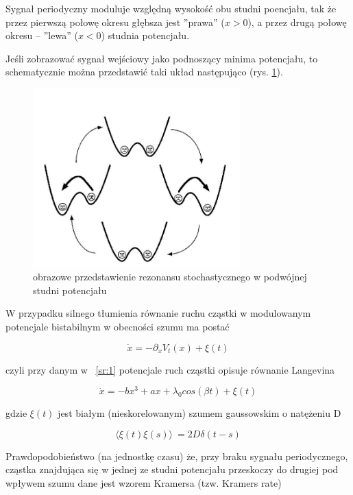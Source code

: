   Sygnał periodyczny moduluje względną wysokość obu studni poencjału, tak że przez pierwszą połowę okresu głębsza jest ''prawa'' ($x>0$), a przez drugą połowę okresu -- ''lewa'' ($x<0$) studnia potencjału.

  Jeśli zobrazować sygnał wejściowy jako podnoszący minima potencjału, to schematycznie można przedstawić taki układ następująco (rys. \ref{fig:graphics:double_well}).

  \begin{figure}
    \includegraphics[width=80mm]{images/sr.jpg}
    \caption{obrazowe przedstawienie rezonansu stochastycznego w podwójnej studni potencjału}
    \label{fig:graphics:double_well}
  \end{figure}

  W przypadku silnego tłumienia równanie ruchu cząstki w modulowanym potencjale bistabilnym w obecności szumu ma postać

  \begin{equation} \label{sr:2}
    \dot x = - \partial_x V_t(x) + \xi (t)
  \end{equation}

  czyli przy danym w ~\ref{sr:1} potencjale ruch cząstki opisuje równanie Langevina

  \begin{equation} \label{sr:3}
    \dot x = -bx ^3 + ax + \lambda_0 cos(\beta t) + \xi (t)
  \end{equation}

  gdzie $\xi (t)$ jest białym (nieskorelowanym) szumem gaussowskim o natężeniu D

  \begin{equation} \label{sr:noise_correlation}
    \langle \xi(t) \xi(s) \rangle\ = 2 D \delta (t-s)
  \end{equation}

  Prawdopodobieństwo (na jednostkę czasu) że, przy braku sygnału periodycznego, cząstka znajdująca się w jednej ze studni potencjału przeskoczy do drugiej pod wpływem szumu dane jest wzorem Kramersa (tzw. Kramers rate)

